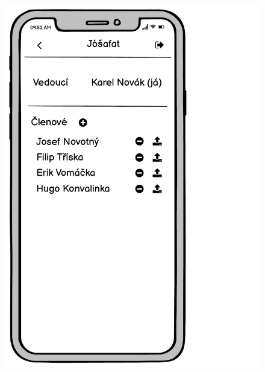 \begin{figure}
    \includegraphics[width=\textwidth/3 - 2pt]{images/3-navrh/3-6-detail-kapely-vedouci.pdf}

\end{figure}
